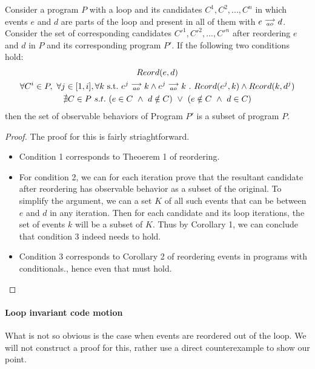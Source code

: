         \begin{corollary}
            Consider a program $P$ with a loop and its candidates $C^1, C^2, ... , C^n$ in which events $e$ and $d$ are parts of the loop and present in all of them with $e\stackrel{\longrightarrow}{_{ao}}d$. Consider the set of corresponding candidates $C'^1, C'^2, ... , C'^n$ after reordering $e$ and $d$ in $P$ and its corresponding program $P'$. If the following two conditions hold:
            \begin{gather*}
                Reord(e, d) \\ 
                \forall C^i \in P , \ \forall j \in [1,i], \forall k \ \text{s.t.} \ \reln{e^j}{ao}{k} \wedge \reln{e^j}{ao}{k} \ . \ Reord(e^j, k) \wedge Reord(k, d^j)  \\ 
                \nexists C \in P \ s.t. \ 
                    (e \in C \ \wedge \ d \notin C) \ \vee \ 
                    (e \notin C \ \wedge \ d \in C) 
            \end{gather*}
            then the set of observable behaviors of Program $P'$ is a subset of program $P$.     
        \end{corollary}

        \begin{proof}
        
            The proof for this is fairly striaghtforward. 
            
            \begin{itemize}
                \item Condition 1 corresponds to Theoerem 1 of reordering. 
                \item For condition 2, we can for each iteration prove that the resultant candidate after reordering has observable behavior as a subset of the original. To simplify the argument, we can a set $K$ of all such events that can be between $e$ and $d$ in  any iteration. 
                Then for each candidate and its loop iterations, the set of events $k$ will be a subset of $K$. Thus by Corollary 1, we can conclude that condition 3 indeed needs to hold. 
                \item Condition 3 corresponds to Corollary 2 of reordering events in programs with conditionals., hence even that must hold. 
            \end{itemize}
            
        \end{proof}


        \paragraph{Loop invariant code motion}
            What is not so obvious is the case when events are reordered out of the loop. We will not construct a proof for this, rather use a direct counterexample to show our point. 

